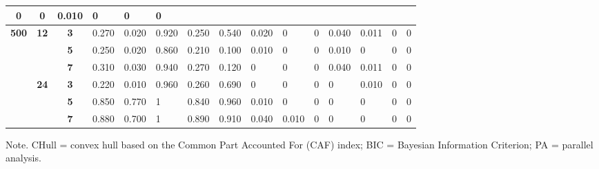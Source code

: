 \documentclass[a4paper,man,natbib]{apa6}
\begin{document}
\begin{table}[]
\begin{center}
{\begin{tabular}{cccllllllllllll}
		0 &
		0 &
		0.010 &
		0 &
		0 &
		0 \\ \hline
		\multirow{6}{*}{\textbf{500}} &
		\multirow{3}{*}{\textbf{12}} &
		\textbf{3} &
		0.270 &
		0.020 &
		0.920 &
		0.250 &
		0.540 &
		0.020 &
		0 &
		0 &
		0.040 &
		0.011 &
		0 &
		0 \\ \cline{3-15} 
		&
		&
		\textbf{5} &
		0.250 &
		0.020 &
		0.860 &
		0.210 &
		0.100 &
		0.010 &
		0 &
		0 &
		0.010 &
		0 &
		0 &
		0 \\ \cline{3-15} 
		&
		&
		\textbf{7} &
		0.310 &
		0.030 &
		0.940 &
		0.270 &
		0.120 &
		0 &
		0 &
		0 &
		0.040 &
		0.011 &
		0 &
		0 \\ \cline{2-15} 
		&
		\multirow{3}{*}{\textbf{24}} &
		\textbf{3} &
		0.220 &
		0.010 &
		0.960 &
		0.260 &
		0.690 &
		0 &
		0 &
		0 &
		0 &
		0.010 &
		0 &
		0 \\ \cline{3-15} 
		&
		&
		\textbf{5} &
		0.850 &
		0.770 &
		1 &
		0.840 &
		0.960 &
		0.010 &
		0 &
		0 &
		0 &
		0 &
		0 &
		0 \\ \cline{3-15} 
		&
		&
		\textbf{7} &
		0.880 &
		0.700 &
		1 &
		0.890 &
		0.910 &
		0.040 &
		0.010 &
		0 &
		0 &
		0 &
		0 &
		0 \\ \hline
	\end{tabular}%
}
	\end{center}
 \begin{tablenotes}[flushleft]
	\small
	\item 	Note. CHull = convex hull based on the Common Part Accounted For (CAF) index; BIC = Bayesian Information Criterion; PA = parallel analysis.
\end{tablenotes}
\end{table}
\end{document}
